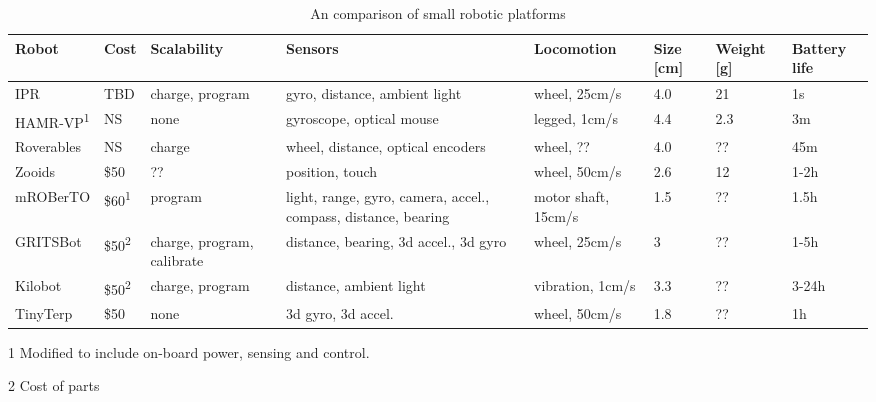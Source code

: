 


\begin{table*}[t]
	\centering
	\tiny
	\begin{threeparttable}
		\caption{An comparison of small robotic platforms}
		\label{tab:comparison_robot_platforms}
 		\begin{tabularx}{\textwidth}{l l X X X l l l} 
			\hline
 			Robot & Cost & Scalability & Sensors & Locomotion & Size [cm] & Weight [g] & Battery life \\ 
 			\hline
 			IPR & TBD & charge, program & gyro, distance, ambient light & wheel, 25cm/s & 4.0 & 21 & 1s\\
 			HAMR-VP\textsuperscript{1} \cite{bruhwiler_iros_2015} & NS & none & gyroscope, optical mouse & legged, 1cm/s & 4.4 & 2.3 & 3m \\
 			Roverables \cite{dementyev_uist_2016} & NS & charge & wheel, distance, optical encoders & wheel, ?? & 4.0 & ?? & 45m \\ 
 			Zooids \cite{legoc_uist_2016} & \$50 & ?? & position, touch & wheel, 50cm/s & 2.6 & 12 & 1-2h \\ 
 			mROBerTO \cite{kim_iros_2016} & \$60\textsuperscript{1} & program & light, range, gyro, camera, accel., compass, distance, bearing & motor shaft, 15cm/s & 1.5 & ?? & 1.5h\\
 			GRITSBot \cite{pickem_icra_2015} & \$50\textsuperscript{2} & charge, program, calibrate & distance, bearing, 3d accel., 3d gyro & wheel, 25cm/s & 3 & ?? & 1-5h \\
 			Kilobot \cite{rubenstein_icra_2012} & \$50\textsuperscript{2} & charge, program & distance, ambient light & vibration, 1cm/s & 3.3 & ?? & 3-24h\\
 			TinyTerp \cite{sabelhaus_icra_2013} & \$50 & none & 3d gyro, 3d accel. & wheel, 50cm/s & 1.8 & ?? & 1h\\
			\hline
		\end{tabularx}
		\begin{tablenotes}
			\item [1] Modified to include on-board power, sensing and control.
			\item [2] Cost of parts
		\end{tablenotes}
	\end{threeparttable}
\end{table*}